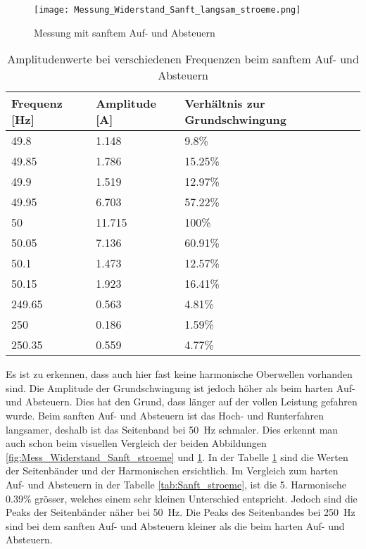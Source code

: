 \begin{figure}[ht!]
	\centering
	\texttt{[image: Messung\_Widerstand\_Sanft\_langsam\_stroeme.png]}	
	\caption{Messung mit sanftem Auf- und Absteuern}\label{fig:Mess_Widerstand_Sanft_langsam_stroeme}
\end{figure}

\begin{table}[ht!]
	\centering
	\begin{tabular}{|l|l|l|}
		\hline
		Frequenz {[}Hz{]} & Amplitude {[}A{]} & Verhältnis zur Grundschwingung	\\ \hline
		49.8              & 1.148             & 9.8\%							\\ \hline
		49.85             & 1.786             & 15.25\%							\\ \hline
		49.9              & 1.519             & 12.97\%							\\ \hline
		49.95             & 6.703             & 57.22\%							\\ \hline
		50                & 11.715            & 100\%							\\ \hline
		50.05             & 7.136             & 60.91\%							\\ \hline
		50.1              & 1.473             & 12.57\%							\\ \hline
		50.15             & 1.923             & 16.41\%							\\ \hline
		249.65            & 0.563             & 4.81\%							\\ \hline
		250               & 0.186             & 1.59\%							\\ \hline
		250.35            & 0.559             & 4.77\%							\\ \hline
	\end{tabular}
	\caption{Amplitudenwerte bei verschiedenen Frequenzen beim sanftem Auf- und Absteuern}\label{tab:Sanft_langsam_stroeme}
\end{table}
Es ist zu erkennen, dass auch hier fast keine harmonische Oberwellen vorhanden sind. Die Amplitude der Grundschwingung ist jedoch höher als beim harten Auf- und Absteuern. Dies hat den Grund, dass länger auf der vollen Leistung gefahren wurde. Beim sanften Auf- und Absteuern ist das Hoch- und Runterfahren langsamer, deshalb ist das Seitenband bei \SI{50}{Hz} schmaler. Dies erkennt man auch schon beim visuellen Vergleich der beiden Abbildungen \ref{fig:Mess_Widerstand_Sanft_stroeme} und \ref{fig:Mess_Widerstand_Sanft_langsam_stroeme}. In der Tabelle \ref{tab:Sanft_langsam_stroeme} sind die Werten der Seitenbänder und der Harmonischen ersichtlich. Im Vergleich zum harten Auf- und Absteuern in der Tabelle \ref{tab:Sanft_stroeme}, ist die 5. Harmonische 0.39\% grösser, welches einem sehr kleinen Unterschied entspricht. Jedoch sind die Peaks der Seitenbänder näher bei \SI{50}{Hz}. Die Peaks des Seitenbandes bei \SI{250}{Hz} sind bei dem sanften Auf- und Absteuern kleiner als die beim harten Auf- und Absteuern.



